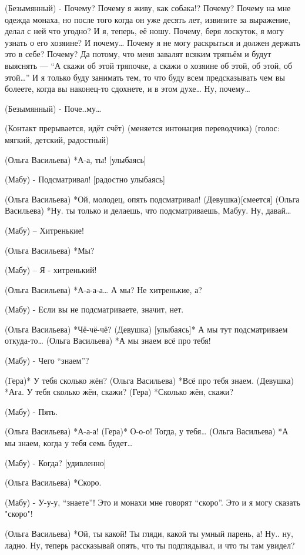 (Безымянный) - Почему? Почему я живу, как собака!? Почему? Почему на мне одежда монаха, но после того когда он уже десять лет, извините за выражение,  делал с ней что угодно? И я, теперь, её ношу. Почему, беря лоскуток, я могу узнать о его хозяине? И почему… Почему я не могу раскрыться и должен держать это в себе? Почему? Да потому, что меня завалят всяким тряпьём и будут выяснять — “А скажи об этой тряпочке, а скажи о хозяине об этой, об этой, об этой…” И я только буду занимать тем, то что буду всем предсказывать чем вы болеете, когда вы наконец-то сдохнете, и в этом духе… Ну, почему…

(Безымянный) - Поче..му…

(Контакт прерывается, идёт счёт)
(меняется интонация переводчика)
(голос: мягкий, детский, радостный)


(Ольга Васильева) *А-а, ты! [улыбаясь]

(Мабу) - Подсматривал! [радостно улыбаясь]

(Ольга Васильева) *Ой, молодец, опять подсматривал!
(Девушка)[смеется]
(Ольга Васильева) *Ну. ты только и делаешь, что подсматриваешь, Мабуу. Ну, давай…

(Мабу) – Хитренькие!

(Ольга Васильева) *Мы?

(Мабу) – Я - хитренький!

(Ольга Васильева) *А-а-а-а… А мы? Не хитренькие, а?

(Мабу) - Если вы не подсматриваете, значит, нет.

(Ольга Васильева) *Чё-чё-чё?
(Девушка) [улыбаясь]* А мы тут подсматриваем откуда-то…
(Ольга Васильева) *А мы знаем всё про тебя!

(Мабу) - Чего “знаем”?

(Гера)* У тебя сколько жён?
(Ольга Васильева) *Всё про тебя знаем.
(Девушка) *Ага. У тебя сколько жён, скажи?
(Гера) *Сколько жён, скажи?

(Мабу) - Пять.

(Ольга Васильева)  *А-а-а!
(Гера)* О-о-о! Тогда, у тебя…
(Ольга Васильева)  *А мы знаем, когда у тебя семь будет…

(Мабу) - Когда? [удивленно]

(Ольга Васильева) *Скоро.

(Мабу) - У-у-у, “знаете”! Это и монахи мне говорят “скоро”. Это и я могу сказать "скоро"!

(Ольга Васильева) *Ой, ты какой! Ты гляди, какой ты умный парень, а! Ну.. ну, ладно. Ну, теперь рассказывай опять, что ты подглядывал, и что ты там увидел?

